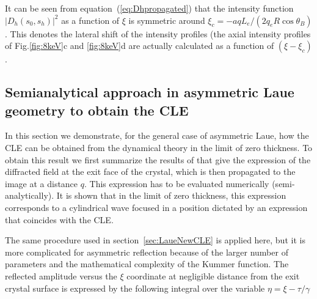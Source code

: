 \documentclass[preprint]{iucr}              %
\newcommand{\todo}[1]{{\color{red}[TODO: "#1'']}}
\begin{document}
\begin{figure}




\end{figure}

It can be seen from equation~(\ref{eq:Dhpropagated}) that the intensity function $|D_h(s_0,s_h)|^2$ as a function of $\xi$ is symmetric around $\xi_c=-a q L_e / (2 q_e R \cos\theta_B)$. This denotes the lateral shift of the intensity profiles (the axial intensity profiles of Fig.\ref{fig:8keV}c and \ref{fig:8keV}d are actually calculated as a function of $(\xi-\xi_c)$.

\subsection{Semianalytical approach in asymmetric Laue geometry to obtain the CLE}
\label{sec:LaueCompatibilityCLE}

In this section we demonstrate, for the general case of asymmetric Laue, how the CLE can be obtained from the dynamical theory in the limit of zero thickness. To obtain this result we first summarize the results of \cite{GuigayFerrero2016} that give the expression of the diffracted field at the exit face of the crystal, which is then propagated to the image at a distance $q$. This expression has to be evaluated numerically (semi-analytically). It is shown that in the limit of zero thickness, this expression corresponds to a cylindrical wave focused in a position dictated by an expression that coincides with the CLE.

The same procedure used in section~\ref{sec:LaueNewCLE} is applied here, but it is more complicated for asymmetric reflection because of the larger number of parameters and the mathematical complexity of the Kummer function. The reflected amplitude versus the $\xi$ coordinate at negligible distance from the exit crystal surface is expressed by the following integral over the variable $\eta=\xi-\tau/\gamma$
\end{document}
